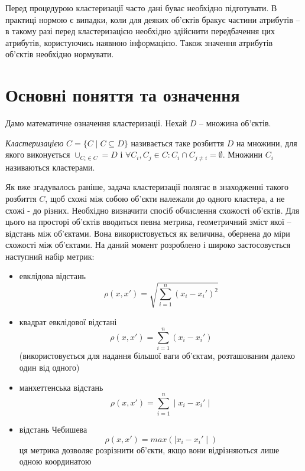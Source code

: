     Перед процедурою кластеризації часто дані буває необхідно підготувати. В практиці нормою є випадки, коли для деяких об'єктів бракує частини атрибутів -- в такому разі перед кластеризацією необхідно здійснити передбачення цих атрибутів, користуючись наявною інформацією. Також значення атрибутів об'єктів необхідно нормувати.

\section{Основні поняття та означення}
    Дамо математичне означення кластеризації. Нехай $D$ -- множина об'єктів. 
    \begin{definition}
        \emph{Кластеризацією} $C = \{C \mid C \subseteq D\}$ називається таке розбиття $D$ на множини, 
        для якого виконується $\cup_{C_i \in C} = D$ і $\forall C_i, C_j \in C : C_i \cap C_{j \neq i} = \emptyset$. 
        Множини $C_i$ називаються кластерами.
    \end{definition}
    Як вже згадувалось раніше, задача кластеризації полягає в знаходженні такого розбиття $C$, щоб схожі між собою об'єкти належали до одного кластера, а не схожі - до різних. Необхідно визначити спосіб обчислення схожості об'єктів.
    Для цього на просторі об'єктів вводиться певна метрика, геометричний зміст якої -- відстань між об'єктами. Вона використовується як величина, обернена до міри схожості між об'єктами. На даний момент розроблено і широко застосовується наступний набір метрик:
    \begin{itemize}
        \item {евклідова відстань} 
            \begin{equation}
                \rho(x, x') = \sqrt{ \sum_{i=1}^n (x_i - x_i')^2}
            \end{equation}
        \item {квадрат евклідової відстані} 
            \begin{equation}
                \rho(x, x') = \sum_{i=1}^n (x_i - x_i')
            \end{equation}
            (використовується для надання більшої ваги об'єктам, розташованим далеко один від одного)
        \item {манхеттенська відстань} 
            \begin{equation}
                \rho(x, x') = \sum_{i=1}^n \mid x_i - x_i' \mid
            \end{equation}
        \item {відстань Чебишева}
            \begin{equation}
                \rho(x, x') = max(\mid x_i - x_i' \mid )
            \end{equation}            
            ця метрика дозволяє розрізнити об'єкти, якщо вони відрізняються лише одною координатою
    \end{itemize}
    
